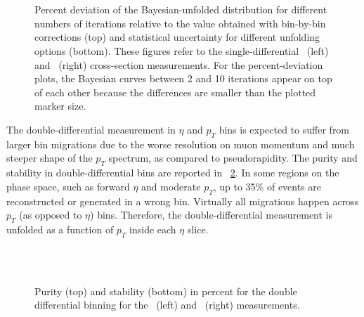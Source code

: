 \begin{figure}[phtb]
  \begin{center}
        \\
        \\
    \caption{Percent deviation of the Bayesian-unfolded distribution for different numbers of iterations relative to the value obtained with bin-by-bin corrections (top) and statistical uncertainty for different unfolding options (bottom). These figures refer to the single-differential \Wmunup~(left) and \Wmunum~(right) cross-section measurements. For the percent-deviation plots, the Bayesian curves between 2 and 10 iterations appear on top of each other because the differences are smaller than the plotted marker size.}
 \label{fig:Wmunu:unftest1D}
 \end{center}
\end{figure}

The double-differential measurement in $\eta$ and $p_T$ bins is expected to suffer
from larger bin migrations due to the worse resolution on muon momentum and much steeper shape of the $p_T$
spectrum, as compared to pseudorapidity. The purity and stability in double-differential bins
are reported in \Fig~\ref{fig:Wmunu:PurityStability2D}. In some regions on the phase space, such as forward $\eta$ 
and moderate $p_T$, up to 35\% of events are reconstructed or generated in a wrong bin. Virtually all migrations
happen across $p_T$ (as opposed to $\eta$) bins. Therefore, the double-differential measurement is unfolded as a function
of $p_T$ inside each $\eta$ slice.

\begin{figure}[phtb]
  \begin{center}
        \\
        \\
 \caption{Purity (top) and stability (bottom) in percent for the double differential binning for the \Wmunup~(left) and \Wmunum~(right) measurements.}
 \label{fig:Wmunu:PurityStability2D}
 \end{center}
\end{figure}

